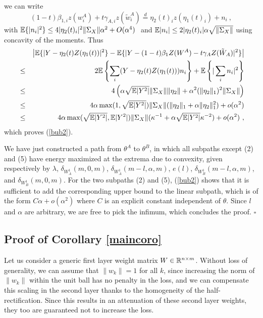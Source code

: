 we can write 
$$(1-t) \beta_{1,i} z(w^A_i) + t \gamma_{A,i} z(\tilde{w}^A_i) \stackrel{d}{=} \eta_2(t)_i z(\eta_1(t)_i) + n_i ~,$$
with ${\mathbb{E}}\{ |n_i |^2 \} \leq 4 |\eta_2(t)_i|^2 \| \Sigma_X \| \alpha^2 + O(\alpha^4)~$ and ${\mathbb{E}} |n_i| \leq 2 |\eta_2(t)_i| \alpha \sqrt{\| \Sigma_X\|}$ using concavity of the moments.
Thus 
\begin{eqnarray*}
&& \left | {\mathbb{E}} \{ | Y - \eta_2(t) Z(\eta_1(t) ) |^2 \}  - {\mathbb{E}} \{ | Y - (1-t) \beta_1 Z(W^A) - t \gamma_A Z(\tilde{W}_A) |^2 \} \right| \\
 &\leq& 2{\mathbb{E}} \left\{  \sum_i (Y - \eta_2(t) Z(\eta_1(t) )) n_i  \right\} + {\mathbb{E}} \left\{ | \sum_i n_i |^2 \right\} \\
 &\leq & 4\left(\alpha \sqrt{{\mathbb{E}}|Y^2|} \| \Sigma_X\|  \| \eta_2 \| + \alpha^2 (\| \eta_2 \|_1)^2  \| \Sigma_X \| \right) \\
 &\leq & 4 \alpha \max(1, \sqrt{{\mathbb{E}}|Y^2|}) \| \Sigma_X \| ( \| \eta_2 \|_1 + \alpha \| \eta_2 \|_1^2) + o(\alpha^2) \\
 & \leq & 4 \alpha \max(\sqrt{{\mathbb{E}}|Y^2|}, {{\mathbb{E}}|Y^2|}) \| \Sigma_X \|  ( \kappa^{-1} + \alpha \sqrt{{\mathbb{E}}|Y^2|} \kappa^{-2}) + o(\alpha^2)~,
\end{eqnarray*}
 which proves (\ref{bub2}). 
 
We have just constructed a path from $\theta^A$ to $\theta^B$, in which all subpaths except (2) and (5) have energy maximized at the extrema due to convexity, given respectively by $\lambda$, $\delta_{W_A^1}(m, 0, m)$, $\delta_{W_A^1}(m-l, \alpha, m)$, $e(l)$, $\delta_{W_B^1}(m-l, \alpha, m)$, and 
$\delta_{W_B^1}(m, 0, m)$.  For the two subpaths (2) and (5), (\ref{bub2}) shows that it is sufficient to add the corresponding upper bound to the linear subpath, which is of the form $C \alpha + o(\alpha^2)$ where $C$ is an explicit constant independent of $\theta$. Since $l$ and $\alpha$ are arbitrary, we are free to pick the infimum, which concludes the proof. $\square$
 




\subsection{Proof of Corollary \ref{maincoro}}

Let us consider a generic first layer weight matrix $W \in {\mathbb{R}}^{n \times m}$. Without loss of generality, we can assume that $\| w_k \|=1$ for all $k$, since increasing the norm of $\|w_k\|$ 
within the unit ball has no penalty in the loss, and we can compensate this scaling in the second layer
thanks to the homogeneity of the half-rectification. Since this results in an attenuation of these second layer weights, 
they too are guaranteed not to increase the loss. 

